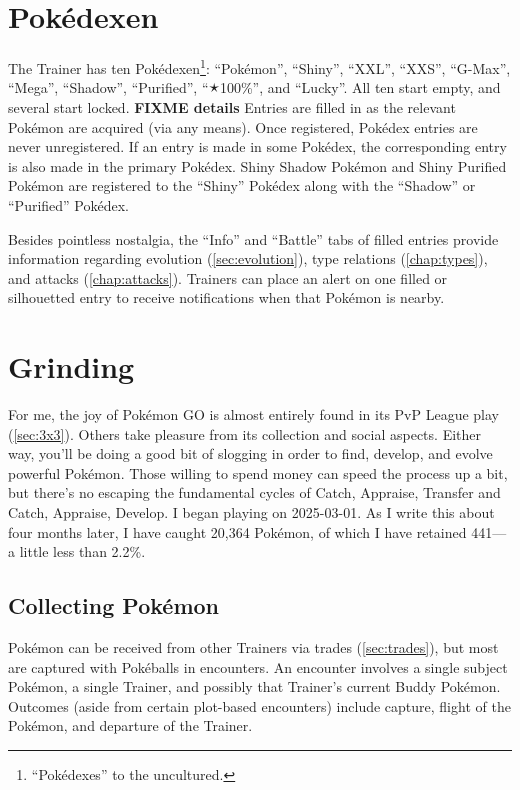 \section{Pokédexen}
\label{sec:dexen}
The Trainer has ten Pokédexen\footnote{``Pokédexes'' to the uncultured.}:
  ``Pokémon'', ``Shiny'', ``XXL'', ``XXS'', ``G-Max'', ``Mega'', ``Shadow'',
  ``Purified'', ``🟉100\%'', and ``Lucky''.
All ten start empty, and several start locked.
\textbf{FIXME details}
Entries are filled in as the relevant Pokémon are acquired (via any means).
Once registered, Pokédex entries are never unregistered.
If an entry is made in some Pokédex, the corresponding entry is also made
  in the primary Pokédex.
Shiny Shadow Pokémon and Shiny Purified Pokémon are registered to the
  ``Shiny'' Pokédex along with the ``Shadow'' or ``Purified'' Pokédex.

Besides pointless nostalgia, the ``Info'' and ``Battle'' tabs of filled entries
  provide information regarding evolution (\autoref{sec:evolution}), type
  relations (\autoref{chap:types}), and attacks (\autoref{chap:attacks}).
Trainers can place an alert on one filled or silhouetted entry to receive
  notifications when that Pokémon is nearby.

\section{Grinding}
\label{sec:grinding}
For me, the joy of Pokémon GO is almost entirely found in its PvP League play (\autoref{sec:3x3}).
Others take pleasure from its collection and social aspects.
Either way, you'll be doing a good bit of slogging in order to find, develop,
  and evolve powerful Pokémon.
Those willing to spend money can speed the process up a bit, but there's
  no escaping the fundamental cycles of Catch, Appraise, Transfer and
  Catch, Appraise, Develop. 
I began playing on 2025-03-01.
As I write this about four months later, I have caught 20,364 Pokémon, of which
  I have retained 441---a little less than 2.2\%.

\subsection{Collecting Pokémon}
\label{subsec:getmons}
Pokémon can be received from other Trainers via trades (\autoref{sec:trades}),
  but most are captured with Pokéballs in encounters.
An encounter involves a single subject Pokémon, a single Trainer,
  and possibly that Trainer's current Buddy Pokémon.
Outcomes (aside from certain plot-based encounters) include capture, flight of
  the Pokémon, and departure of the Trainer.

